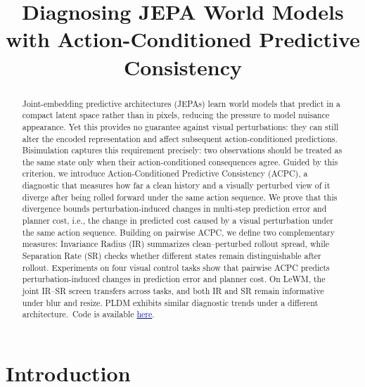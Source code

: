 \documentclass{article}
\title{Diagnosing JEPA World Models with Action-Conditioned Predictive Consistency}
\author{\parbox{\dimexpr\textwidth-2\tabcolsep\relax}{\centering\normalfont\arxivauthors}}
\begin{document}
\maketitle
\fancyhead{}
\renewcommand{\headrulewidth}{0pt}
\begingroup
\renewcommand{\thefootnote}{}
\makeatletter
\def\Hy@footnote@currentHref{paper.authornotes}
\makeatother
\footnotetext{\arxivauthornotes}
\endgroup

\begin{abstract}
Joint-embedding predictive architectures (JEPAs) learn world models that
predict in a compact latent space rather than in pixels, reducing the
pressure to model nuisance appearance. Yet this provides no guarantee against visual perturbations: they can
still alter the encoded representation and affect subsequent
action-conditioned predictions.
Bisimulation captures this requirement precisely: two observations should be
treated as the same state only when their action-conditioned consequences
agree. Guided by this criterion, we introduce Action-Conditioned Predictive
Consistency (ACPC), a diagnostic that measures how far a clean history and
a visually perturbed view of it diverge after being rolled forward under the
same action sequence. We prove that this divergence bounds perturbation-induced changes in multi-step prediction error and planner cost, i.e., the change in predicted cost caused by a visual perturbation under the same action sequence. Building on pairwise ACPC, we define two complementary measures: Invariance Radius (IR) summarizes clean--perturbed rollout spread, while Separation Rate (SR) checks whether different states remain distinguishable after rollout.
Experiments on four visual control tasks show that pairwise ACPC predicts perturbation-induced changes in prediction error and planner cost. On LeWM, the joint IR--SR screen
transfers across tasks, and both IR and SR remain informative under blur and
resize. PLDM exhibits similar diagnostic trends
under a different architecture.\ifdefined\blindsubmission\else\
Code is available \href{\paperpubliccodeurl}{\textcolor{blue}{here}}.\fi

\end{abstract}

\section{Introduction}\label{sec:intro}
\end{document}
